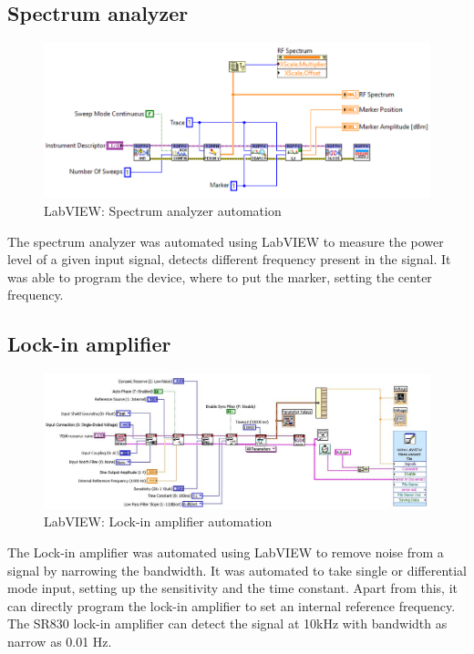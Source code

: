 \documentclass[12pt,a4paper,bold]{thesis}
\theoremstyle{thm}
\theoremstyle{definition}
\begin{document}
\subsection{Spectrum analyzer}
\begin{figure}[H]
	\centering
   \includegraphics[scale=0.56]{Images/51.png} 
   \caption{LabVIEW: Spectrum analyzer automation}
\end{figure}
\indent\indent\indent The spectrum analyzer was automated using LabVIEW to measure the power level of a given input signal, detects different frequency present in the signal. It was able to program the device, where to put the marker, setting the center frequency.
\subsection{Lock-in amplifier}
\begin{figure}[H]
	\centering
   \includegraphics[width=12cm]{Images/45.png} 
   \caption{LabVIEW: Lock-in amplifier automation}
\end{figure}
\indent\indent\indent The Lock-in amplifier was automated using LabVIEW to remove noise from a signal by narrowing the bandwidth. It was automated to take single or differential mode input, setting up the sensitivity and the time constant. Apart from this, it can directly program the lock-in amplifier to set an internal reference frequency. The SR830 lock-in amplifier can detect the signal at 10kHz with bandwidth as narrow as 0.01 Hz. 
\end{document}
